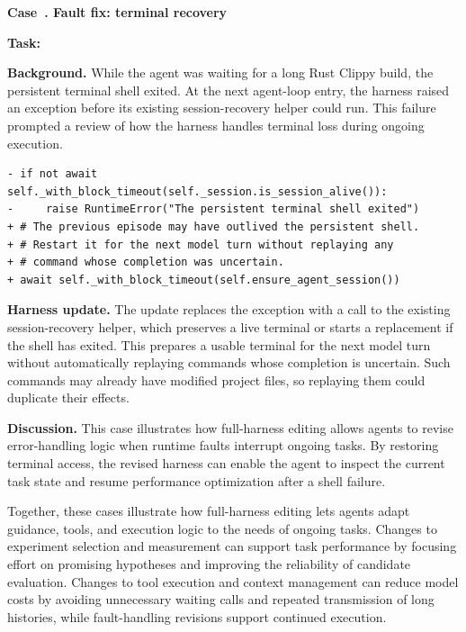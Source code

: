 \par\medskip
{}
\label{case:fault}
\noindent\textbf{Case~\theharnesscase. Fault fix: terminal recovery}
\par\nopagebreak

\noindent\textbf{Task:} {\small{}}

\textbf{Background.}
While the agent was waiting for a long Rust Clippy build, the persistent terminal shell exited. At the next agent-loop entry, the harness raised an exception before its existing session-recovery helper could run. This failure prompted a review of how the harness handles terminal loss during ongoing execution.

\begin{lstlisting}[linebackgroundcolor={\DiffBackground{3,4,5,6}{1,2}}]
- if not await self._with_block_timeout(self._session.is_session_alive()):
-     raise RuntimeError("The persistent terminal shell exited")
+ # The previous episode may have outlived the persistent shell.
+ # Restart it for the next model turn without replaying any
+ # command whose completion was uncertain.
+ await self._with_block_timeout(self.ensure_agent_session())
\end{lstlisting}

\textbf{Harness update.}
The update replaces the exception with a call to the existing session-recovery helper, which preserves a live terminal or starts a replacement if the shell has exited. This prepares a usable terminal for the next model turn without automatically replaying commands whose completion is uncertain. Such commands may already have modified project files, so replaying them could duplicate their effects.

\textbf{Discussion.}
This case illustrates how full-harness editing allows agents to revise error-handling logic when runtime faults interrupt ongoing tasks. By restoring terminal access, the revised harness can enable the agent to inspect the current task state and resume performance optimization after a shell failure.

Together, these cases illustrate how full-harness editing lets agents adapt guidance, tools, and execution logic to the needs of ongoing tasks. Changes to experiment selection and measurement can support task performance by focusing effort on promising hypotheses and improving the reliability of candidate evaluation. Changes to tool execution and context management can reduce model costs by avoiding unnecessary waiting calls and repeated transmission of long histories, while fault-handling revisions support continued execution.
\endgroup

